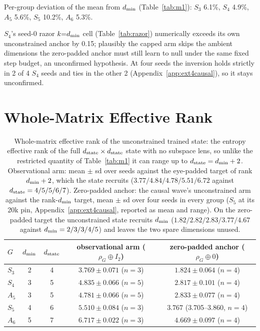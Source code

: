 Per-group deviation of the mean from $d_{\min}$ (Table~\ref{tab:m1}):
$S_3$ 6.1\%, $S_4$ 4.9\%, $A_5$ 5.6\%, $S_5$ 10.2\%, $A_6$ 5.3\%.

$S_4$'s seed-0 razor $k{=}d_{\min}$ cell (Table~\ref{tab:razor}) numerically exceeds its own unconstrained anchor by 0.15;
plausibly the capped arm skips the ambient dimensions the zero-padded
anchor must still learn to null under the same fixed step budget, an
unconfirmed hypothesis.
At four seeds the inversion holds strictly in 2 of 4 $S_4$ seeds and
ties in the other 2 (Appendix~\ref{app:ext4causal}), so it stays
unconfirmed.

\section{Whole-Matrix Effective Rank}
\label{app:wmrank}

\begin{table}[H]
\centering
\small
\begin{tabular}{lcccc}
\toprule
$G$ & $d_{\min}$ & $d_{\mathrm{state}}$ & observational arm ($\rho_G \oplus I_2$) & zero-padded anchor ($\rho_G \oplus 0$) \\
\midrule
$S_3$ & 2 & 4 & $3.769 \pm 0.071$ ($n{=}3$) & $1.824 \pm 0.064$ ($n{=}4$) \\
$S_4$ & 3 & 5 & $4.835 \pm 0.066$ ($n{=}5$) & $2.817 \pm 0.101$ ($n{=}4$) \\
$A_5$ & 3 & 5 & $4.781 \pm 0.066$ ($n{=}5$) & $2.833 \pm 0.077$ ($n{=}4$) \\
$S_5$ & 4 & 6 & $5.510 \pm 0.084$ ($n{=}3$) & $3.767$ (3.705--3.860, $n{=}4$) \\
$A_6$ & 5 & 7 & $6.717 \pm 0.022$ ($n{=}3$) & $4.669 \pm 0.097$ ($n{=}4$) \\
\bottomrule
\end{tabular}
\caption{Whole-matrix effective rank of the unconstrained trained state:
the entropy effective rank of the full $d_{\mathrm{state}} \times d_{\mathrm{state}}$ state
with no subspace lens, so unlike the restricted quantity of
Table~\ref{tab:m1} it can range up to $d_{\mathrm{state}} = d_{\min} + 2$. Observational
arm: mean $\pm$ sd over seeds against the eye-padded target of rank
$d_{\min} + 2$, which the state recruits ($3.77/4.84/4.78/5.51/6.72$ against
$d_{\mathrm{state}} = 4/5/5/6/7$). Zero-padded anchor: the
causal wave's unconstrained arm against the rank-$d_{\min}$ target, mean
$\pm$ sd over four seeds in every group ($S_5$ at its 20k pin,
Appendix~\ref{app:ext4causal}, reported as mean and range). On the
zero-padded target the unconstrained state recruits $d_{\min}$
($1.82/2.82/2.83/3.77/4.67$ against $d_{\min} = 2/3/3/4/5$) and leaves the
two spare dimensions unused.}
\label{tab:wmrank}
\end{table}


